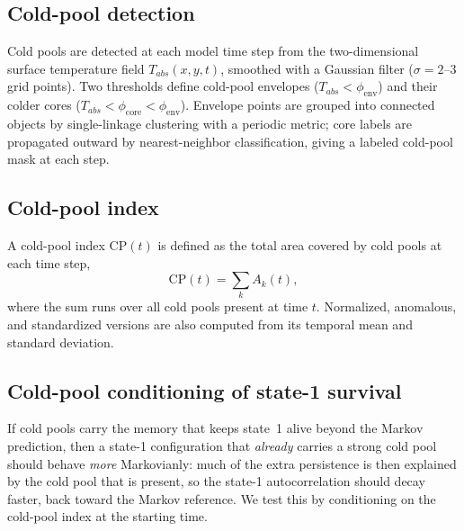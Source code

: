 \documentclass[
    aps,
    prl,
    reprint,
    superscriptaddress,
    amsmath,amssymb,
    nofootinbib,
    floatfix
]{revtex4-2}
\begin{document}
\subsection*{Cold-pool detection}

Cold pools are detected at each model time step from the two-dimensional surface temperature field $T_{abs}(x,y,t)$, smoothed with a Gaussian filter ($\sigma = 2$--$3$ grid points). Two thresholds define cold-pool envelopes ($T_{abs}<\phi_{\mathrm{env}}$) and their colder cores ($T_{abs}<\phi_{\mathrm{core}}<\phi_{\mathrm{env}}$). Envelope points are grouped into connected objects by single-linkage clustering with a periodic metric; core labels are propagated outward by nearest-neighbor classification, giving a labeled cold-pool mask at each step.


\subsection*{Cold-pool index}

A cold-pool index $\mathrm{CP}(t)$ is defined as the total area covered by cold pools at each time step,
\begin{equation}
\mathrm{CP}(t) = \sum_k A_k(t),
\end{equation}
where the sum runs over all cold pools present at time $t$. Normalized, anomalous, and standardized versions are also computed from its temporal mean and standard deviation.


\subsection*{Cold-pool conditioning of state-1 survival}

If cold pools carry the memory that keeps state~1 alive beyond the Markov prediction, then a state-1 configuration that \emph{already} carries a strong cold pool should behave \emph{more} Markovianly: much of the extra persistence is then explained by the cold pool that is present, so the state-1 autocorrelation should decay faster, back toward the Markov reference. We test this by conditioning on the cold-pool index at the starting time.
\end{document}
